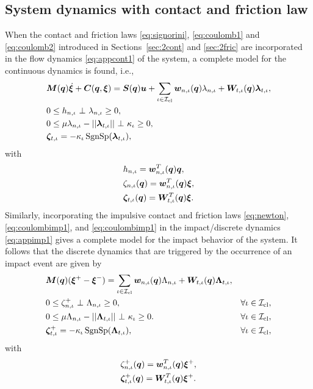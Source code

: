 \documentclass[../DC2017114Bouma.tex]{subfiles}
\begin{document}
\subsection{System dynamics with contact and friction law}\label{sec:2contfric}
When the contact and friction laws \eqref{eq:signorini}, \eqref{eq:coulomb1} and \eqref{eq:coulomb2} introduced in Sections~\ref{sec:2cont} and \ref{sec:2fric} are incorporated in the flow dynamics \eqref{eq:appcont1} of the system, a complete model for the continuous dynamics is found, i.e.,
\begin{align}
&\Mb(\qb)\dot{\xib} + \Cb(\qb,\xib) = \Sb(\qb)\ub + \sum_{\iota\in\Ic_{\text{cl}}}\wb_{n,\iota}(\qb)\lambda_{n,\iota} + \Wb_{t,\iota}(\qb)\lambdab_{t,\iota}, \label{eq:ncpcontact1}\\
&0\leq h_{n,\iota}\ \bot\ \lambda_{n,\iota} \geq 0,\label{eq:ncpcontact2}\\
&0\leq \mu\lambda_{n,\iota} - ||\lambdab_{t,\iota}||\ \bot\ \kappa_{\iota} \geq 0,\label{eq:ncpcontact3}\\
&\zetab_{t,\iota} = -\kappa_{\iota}\SgnSp(\lambdab_{t,\iota}),\label{eq:ncpcontact4}
\end{align}
with 
\begin{align}
&h_{n,\iota} = {\boldsymbol{w}}_{n,\iota}^T({\boldsymbol{q}}){\boldsymbol{q}},\label{eq:h}\\
&\zeta_{n,\iota}({\boldsymbol{q}}) = {\boldsymbol{w}}^T_{n,\iota}({\boldsymbol{q}}) \boldsymbol{\xi},  \label{eq:zetan}\\
&\boldsymbol{\zeta}_{t,\iota}({\boldsymbol{q}}) = {\boldsymbol{W}}^T_{t,\iota}({\boldsymbol{q}}) \boldsymbol{\xi}. \label{eq:zetab}
\end{align}
Similarly, incorporating the impulsive contact and friction laws \eqref{eq:newton}, \eqref{eq:coulombimp1}, and \eqref{eq:coulombimp1} in the impact/discrete dynamics \eqref{eq:appimp1} gives a complete model for the impact behavior of the system. It follows that the discrete dynamics that are triggered by the occurrence of an impact event are given by
\begin{align}
&\Mb(\qb)(\xib^+ - \xib^-) = \sum_{\iota\in\Ic_{\text{cl}}} \wb_{n,\iota}(\qb)\Lambda_{n,\iota} + \Wb_{t,\iota}(\qb)\Lambdab_{t,\iota}, \label{eq:ncpimpact1}\\
&0\leq \zeta_{n,\iota}^+\ \bot\ \Lambda_{n,\iota} \geq 0, &\forall \iota\in\Ic_{\text{cl}},\label{eq:ncpimpact2}\\
&0 \leq \mu\Lambda_{n,\iota} - ||\Lambdab_{t,\iota}||\ \bot\ \kappa_{\iota} \geq 0. &\forall \iota\in\Ic_{\text{cl}},\label{eq:ncpimpact3}\\
&\zetab_{t,\iota}^+ = -\kappa_{\iota}\SgnSp(\Lambdab_{t,\iota}), &\forall \iota\in\Ic_{\text{cl}},\label{eq:ncpimpact4}
\end{align}
with 
\begin{align}
&\zeta^+_{n,\iota}({\boldsymbol{q}}) = {\boldsymbol{w}}^T_{n,\iota}({\boldsymbol{q}}) \boldsymbol{\xi}^+,\\
&\boldsymbol{\zeta}^+_{t,\iota}({\boldsymbol{q}}) = {\boldsymbol{W}}^T_{t,\iota}({\boldsymbol{q}}) \boldsymbol{\xi}^+.\label{eq:ncpimpactend}
\end{align}
\end{document}
